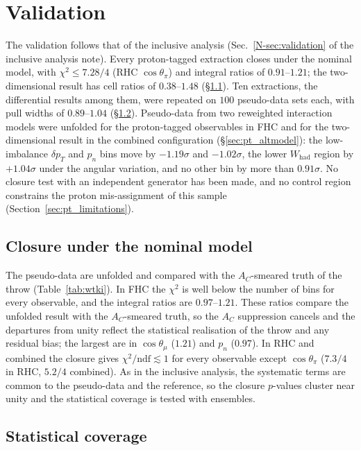 \documentclass[11pt,a4paper]{article}
\newcommand{\noteref}[2]{#1~\ref{N-#2} of the inclusive analysis note}
\begin{document}
\section{Validation}
\label{sec:pt_validation}

The validation follows that of the inclusive analysis (\noteref{Sec.}{sec:validation}). Every
proton-tagged extraction closes under the nominal model, with $\chi^2\le7.28/4$ (RHC $\cos\theta_\pi$)
and integral ratios of $0.91$--$1.21$; the two-dimensional result has cell ratios of $0.38$--$1.48$
(\S\ref{sec:pt_closure}). Ten extractions, the differential  results among them, were
repeated on $100$ pseudo-data sets each, with pull widths of $0.89$--$1.04$ (\S\ref{sec:pt_ensemble}). Pseudo-data from
two reweighted interaction models were unfolded for the proton-tagged observables in FHC and for the
two-dimensional result in the combined configuration (\S\ref{sec:pt_altmodel}): the low-imbalance
$\delta p_T$ and $p_n$ bins move by $-1.19\sigma$ and $-1.02\sigma$, the lower $W_\mathrm{had}$ region by $+1.04\sigma$
under the angular variation, and no other bin by more than $0.91\sigma$. No closure test with an independent generator has been made, and no control region
constrains the proton mis-assignment of this sample (Section~\ref{sec:pt_limitations}).

\subsection{Closure under the nominal model}
\label{sec:pt_closure}

The pseudo-data are unfolded and compared with the $A_C$-smeared truth of the throw
(Table~\ref{tab:wtki}). In FHC the $\chi^2$ is well below the number of bins
for every observable, and the integral ratios are $0.97$--$1.21$. These ratios compare the unfolded
result with the $A_C$-smeared truth, so the $A_C$ suppression cancels and the departures from unity
reflect the statistical realisation of the throw and any residual bias; the largest are in
$\cos\theta_\mu$ ($1.21$) and $p_n$ ($0.97$). In RHC and combined the closure gives
$\chi^2/\mathrm{ndf}\lesssim1$ for every observable except $\cos\theta_\pi$ ($7.3/4$ in RHC, $5.2/4$ combined). As in the inclusive
analysis, the systematic terms are common to the pseudo-data and the reference, so the closure
$p$-values cluster near unity and the statistical coverage is tested with ensembles.

\subsection{Statistical coverage}
\label{sec:pt_ensemble}
\end{document}
